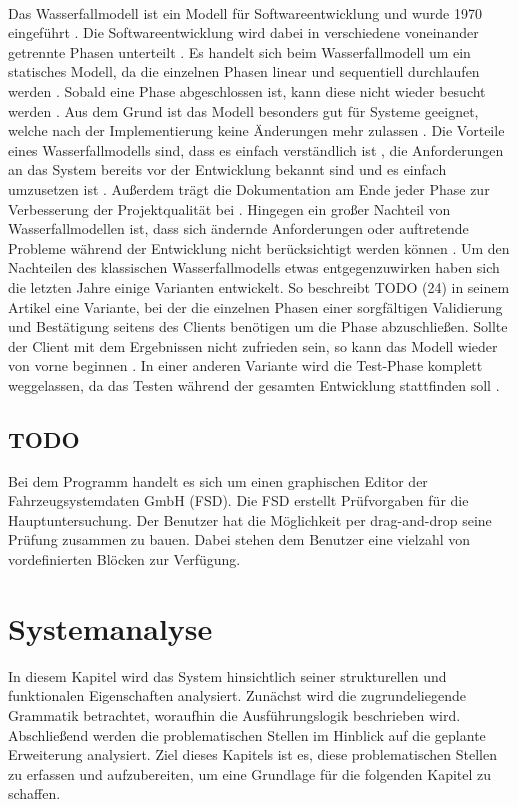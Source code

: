 \documentclass{article}
\begin{document}
    \\
    Das Wasserfallmodell ist ein Modell für Softwareentwicklung \cite{24} und wurde 1970 eingeführt \cite{25}. 
    Die Softwareentwicklung wird dabei in verschiedene voneinander getrennte Phasen unterteilt \cite{22}.
    Es handelt sich beim Wasserfallmodell um ein statisches Modell, da die einzelnen Phasen linear und sequentiell durchlaufen werden \cite{22}.
    Sobald eine Phase abgeschlossen ist, kann diese nicht wieder besucht werden \cite{22}. 
    Aus dem Grund ist das Modell besonders gut für Systeme geeignet, welche nach der Implementierung keine Änderungen mehr zulassen \cite{22}. 
    Die Vorteile eines Wasserfallmodells sind, dass es einfach verständlich ist \cite{22}, die Anforderungen an das System bereits vor der Entwicklung bekannt sind und es einfach umzusetzen ist \cite{23}.
    Außerdem trägt die Dokumentation am Ende jeder Phase zur Verbesserung der Projektqualität bei \cite{23}.
    Hingegen ein großer Nachteil von Wasserfallmodellen ist, dass sich ändernde Anforderungen oder auftretende Probleme während der Entwicklung nicht berücksichtigt werden können \cite{23}.
    Um den Nachteilen des klassischen Wasserfallmodells etwas entgegenzuwirken haben sich die letzten Jahre einige Varianten entwickelt.
    So beschreibt TODO (24) in seinem Artikel eine Variante, bei der die einzelnen Phasen einer sorgfältigen Validierung und Bestätigung seitens des Clients benötigen um die Phase abzuschließen. 
    Sollte der Client mit dem Ergebnissen nicht zufrieden sein, so kann das Modell wieder von vorne beginnen \cite{24}. 
    In einer anderen Variante wird die Test-Phase komplett weggelassen, da das Testen während der gesamten Entwicklung stattfinden soll \cite{25}.
    \subsection{TODO}
    Bei dem Programm handelt es sich um einen graphischen Editor der Fahrzeugsystemdaten GmbH (FSD).
    Die FSD erstellt Prüfvorgaben für die Hauptuntersuchung.
    Der Benutzer hat die Möglichkeit per drag-and-drop seine Prüfung zusammen zu bauen.
    Dabei stehen dem Benutzer eine vielzahl von vordefinierten Blöcken zur Verfügung.
    \newpage
    \section{Systemanalyse}
    In diesem Kapitel wird das System hinsichtlich seiner strukturellen und funktionalen Eigenschaften analysiert. 
    Zunächst wird die zugrundeliegende Grammatik betrachtet, woraufhin die Ausführungslogik beschrieben wird. Abschließend werden die problematischen Stellen im Hinblick auf die geplante Erweiterung analysiert.
    Ziel dieses Kapitels ist es, diese problematischen Stellen zu erfassen und aufzubereiten, um eine Grundlage für die folgenden Kapitel zu schaffen.\\
\end{document}
